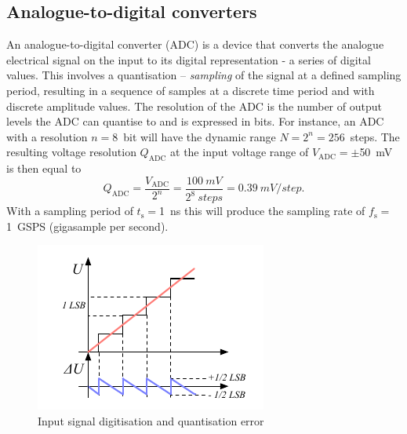 \subsection{Analogue-to-digital converters}
An analogue-to-digital converter (ADC) is a device that converts the analogue electrical signal on the input to its digital representation - a series of digital values. This involves a quantisation -- \emph{sampling} of the signal at a defined sampling period, resulting in a sequence of samples at a discrete time period and with discrete amplitude values. The resolution of the ADC is the number of output levels the ADC can quantise to and is expressed in bits. For instance, an ADC with a resolution $n=8$~bit will have the dynamic range $N=2^n=256$~steps. The resulting voltage resolution $Q_\mathrm{ADC}$ at the input voltage range of $V_\mathrm{ADC}=\pm$50~mV is then equal to 
\begin{equation}
\label{eq:mvpercnt}
Q_\mathrm{ADC}=\frac{V_\mathrm{ADC}}{2^{n}}  = \frac{100~mV}{2^8~steps} = 0.39~mV/step.
\end{equation} 
With a sampling period of $t_\mathrm{s}=$1~ns this will produce the sampling rate of $f_\mathrm{s}=$1~GSPS (gigasample per second).
\begin{figure}[!t]
\begin{center}
\includegraphics[width=0.7\linewidth]{02_pulse_formation/pics/plots/qerr}
\caption{Input signal digitisation and quantisation error}
\label{fig:qerr}
\end{center}
\end{figure}


